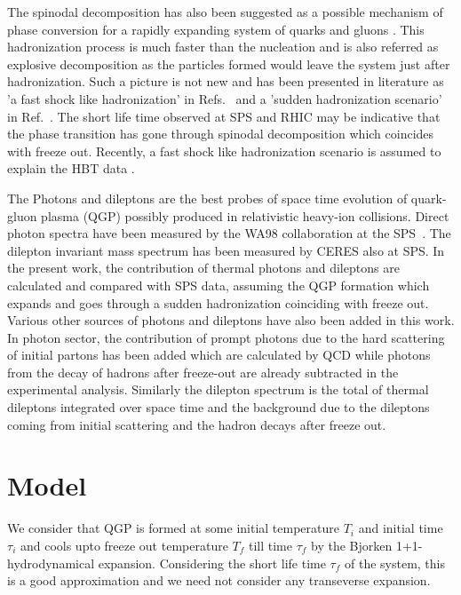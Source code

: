    The spinodal decomposition has also been suggested as a
possible mechanism of phase conversion for a rapidly expanding system of 
quarks and gluons \cite{SPINO,DUMHEP,DUMPRL}. This hadronization process
is much faster than the nucleation and is  
also  referred as explosive decomposition \cite{DUMEXP} as the particles 
formed would leave the system just after hadronization. 
 Such a picture is not new and has been presented in literature
as 'a fast shock like hadronization' in 
Refs.~\cite{CSORGO} and a 'sudden hadronization scenario' in 
Ref.~\cite{RAFEL}.
    The short life time observed at SPS and RHIC
may be indicative that the phase transition has gone through spinodal 
decomposition which coincides with freeze out.
 Recently, a fast shock like hadronization scenario is assumed 
to explain the HBT data \cite{CSERNAI}.

  The Photons and dileptons are the best probes of space time evolution of 
quark-gluon plasma (QGP) possibly produced in relativistic heavy-ion
collisions. Direct photon spectra have been measured by
the WA98 collaboration at the SPS~\cite{WA98_2000}.
The dilepton invariant mass spectrum has been measured by CERES \cite{CERES}
also at SPS.
   In the present work, the contribution of thermal photons and dileptons 
are calculated and compared with SPS data, assuming the QGP formation which 
expands and goes through a sudden hadronization coinciding with freeze out.
 Various other sources of photons and dileptons have also been added
in this work.
 In photon sector, the contribution of prompt photons due to the 
hard scattering of initial partons has been added which are calculated by QCD
while photons from the decay of hadrons
after freeze-out are already subtracted in the experimental analysis.
 Similarly the dilepton spectrum is the total of thermal dileptons 
integrated over space time and the background due to the
dileptons coming from initial scattering and the hadron decays after 
freeze out.


\section{Model}

 We consider that QGP is formed at some initial temperature $T_i$ and
initial time $\tau_i$ and cools upto freeze out temperature 
$T_f$ till time $\tau_f$ by the Bjorken
1+1-hydrodynamical expansion. Considering the short life time 
$\tau_f$ of the system, this is a good approximation and we need 
not consider any transeverse expansion.

